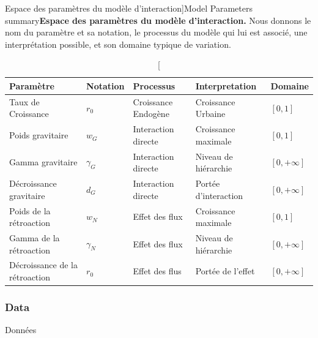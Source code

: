 \begin{table}[ht]
\caption[Model Parameters summary][Espace des paramètres du modèle d'interaction]{Model Parameters summary\label{tab:parameters}}{\textbf{Espace des paramètres du modèle d'interaction.} Nous donnons le nom du paramètre et sa notation, le processus du modèle qui lui est associé, une interprétation possible, et son domaine typique de variation.\label{tab:interactiongibrat:parameters}}
\begin{tabular}{|l|l|l|l|l|}
\hline
Paramètre & Notation & Processus & Interpretation & Domaine\\
\hline
Taux de Croissance & $r_0$ & Croissance Endogène & Croissance Urbaine & $\left[ 0,1\right]$ \\
Poids gravitaire & $w_G$ & Interaction directe & Croissance maximale & $\left[ 0,1\right]$ \\
Gamma gravitaire & $\gamma_G$ & Interaction directe & Niveau de hiérarchie & $\left[ 0,+\infty\right]$ \\
Décroissance gravitaire & $d_G$ & Interaction directe & Portée d'interaction & $\left[ 0,+\infty\right]$ \\
Poids de la rétroaction & $w_N$ & Effet des flux & Croissance maximale & $\left[ 0,1\right]$ \\
Gamma de la rétroaction & $\gamma_N$ & Effet des flux & Niveau de hiérarchie & $\left[ 0,+\infty\right]$ \\
Décroissance de la rétroaction & $r_0$ & Effet des flus & Portée de l'effet & $\left[ 0,+\infty\right]$ \\
\hline
\end{tabular}
\end{table}




\subsubsection{Data}{Données}


